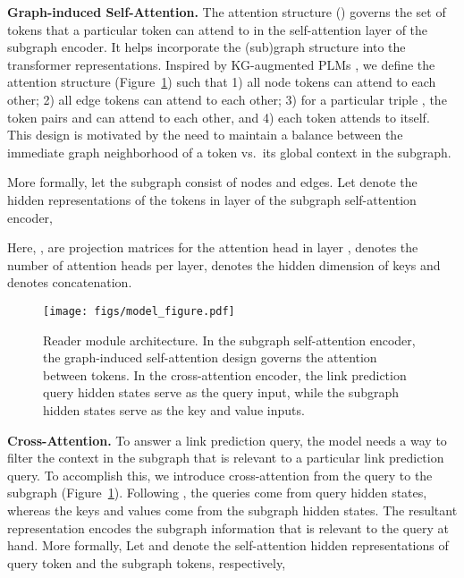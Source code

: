\noindent \textbf{Graph-induced Self-Attention.} The attention structure () governs the set of tokens that a particular token can attend to in the self-attention layer of the subgraph encoder. It helps incorporate the (sub)graph structure into the transformer representations.
Inspired by KG-augmented PLMs \cite{he-etal-2020-bert, he2021klmo}, we define the attention structure (Figure~\ref{fig:model_overall}) such that 1) all node tokens can attend to each other; 2) all edge tokens can attend to each other; 3) for a particular triple , the token pairs  and  can attend to each other, and 4) each token attends to itself. This design is motivated by the need to maintain a balance between the immediate graph neighborhood of a token vs.\ its global context in the subgraph.

More formally, let the subgraph consist of  nodes and  edges.
Let  denote the hidden representations of the tokens in layer  of the subgraph self-attention encoder,

\noindent Here, ,  are projection matrices for the  attention head in layer ,  denotes the number of attention heads per layer,  denotes the hidden dimension of keys and  denotes concatenation.\\

\begin{figure}[htbp]
    \centering
    \texttt{[image: figs/model\_figure.pdf]}
    \caption{Reader module architecture. In the subgraph self-attention encoder, the graph-induced self-attention design governs the attention between tokens. In the cross-attention encoder, the link prediction query hidden states serve as the query input, while the subgraph hidden states serve as the key and value inputs.}
    \label{fig:model_overall}
\end{figure}




\noindent \textbf{Cross-Attention.} To answer a link prediction query, the model needs a way to filter the context in the subgraph that is relevant to a particular link prediction query. To accomplish this, we introduce cross-attention from the query to the subgraph (Figure~\ref{fig:model_overall}). Following \citet{vaswani2017attention}, the queries come from query hidden states, whereas the keys and values come from the subgraph hidden states. The resultant representation encodes the subgraph information that is relevant to the query at hand. 
More formally, Let  and  denote the self-attention hidden representations of  query token and the subgraph tokens, respectively,



